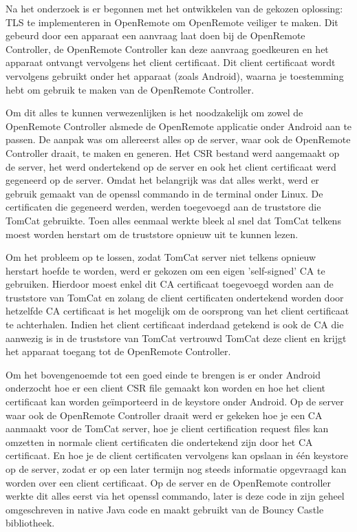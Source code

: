 \documentclass{article}
\begin{document}
Na het onderzoek is er begonnen met het ontwikkelen van de gekozen
oplossing: TLS te implementeren in OpenRemote om OpenRemote veiliger te
maken. Dit gebeurd door een apparaat een aanvraag laat doen bij de
OpenRemote Controller, de OpenRemote Controller kan deze aanvraag
goedkeuren en het apparaat ontvangt vervolgens het client certificaat. Dit
client certificaat wordt vervolgens gebruikt onder het apparaat (zoals
Android), waarna je toestemming hebt om gebruik te maken van de OpenRemote
Controller.

Om dit alles te kunnen verwezenlijken is het noodzakelijk om zowel de
OpenRemote Controller alsmede de OpenRemote applicatie onder Android aan te
passen. De aanpak was  om allereerst alles op de server, waar ook de
OpenRemote Controller draait, te maken en generen. Het CSR bestand werd
aangemaakt op de server, het werd ondertekend op de server en ook het
client certificaat werd gegeneerd op de server. Omdat het belangrijk was
dat alles werkt, werd er gebruik gemaakt van de openssl commando in de
terminal onder Linux. De certificaten die gegeneerd werden, werden
toegevoegd aan de truststore die TomCat gebruikte. Toen alles eenmaal
werkte bleek al snel dat TomCat telkens moest worden herstart om de
truststore opnieuw uit te kunnen lezen.

Om het probleem op te lossen, zodat TomCat server niet telkens opnieuw
herstart hoefde te worden, werd er gekozen om een eigen 'self-signed' CA te
gebruiken. Hierdoor moest enkel dit CA certificaat toegevoegd worden aan de
truststore van TomCat en zolang de client certificaten ondertekend worden
door hetzelfde CA certificaat is het mogelijk om de oorsprong van het
client certificaat te achterhalen. Indien het client certificaat inderdaad
getekend is ook de CA die aanwezig is in de truststore van TomCat vertrouwd
TomCat deze client en krijgt het apparaat toegang tot de OpenRemote
Controller.

Om het bovengenoemde tot een goed einde te brengen is er onder Android
onderzocht hoe er een client CSR file gemaakt kon worden en hoe het client
certificaat kan worden geïmporteerd in de keystore onder Android. Op de
server waar ook de OpenRemote Controller draait werd er gekeken hoe je een
CA aanmaakt voor de TomCat server, hoe je client certification request
files kan omzetten in normale client certificaten die ondertekend zijn door
het CA certificaat. En hoe je de client certificaten vervolgens kan opslaan
in één keystore op de server, zodat er op een later termijn nog steeds
informatie opgevraagd kan worden over een client certificaat. Op de server
en de OpenRemote controller werkte dit alles eerst via het openssl
commando, later is deze code in zijn geheel omgeschreven in native Java
code en maakt gebruikt van de Bouncy Castle bibliotheek.
\end{document}
